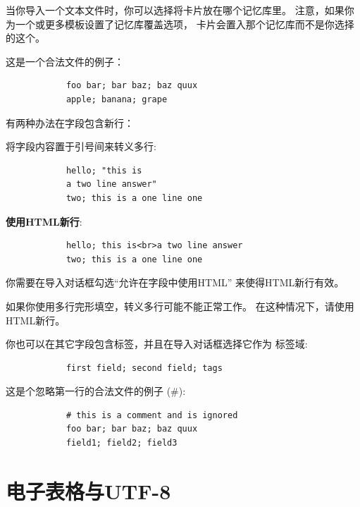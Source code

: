 \documentclass[a4paper]{book}
\begin{document}
		当你导入一个文本文件时，你可以选择将卡片放在哪个记忆库里。 注意，如果你为一个或更多模板设置了记忆库覆盖选项， 卡片会置入那个记忆库而不是你选择的这个。
		
		这是一个合法文件的例子：
		\begin{shaded}\begin{verbatim}
			foo bar; bar baz; baz quux
			apple; banana; grape
			\end{verbatim}\end{shaded}
		有两种办法在字段包含新行：
		
		将字段内容置于引号间来转义多行:
		
		\begin{shaded}\begin{verbatim}
			hello; "this is
			a two line answer"
			two; this is a one line one
			\end{verbatim}\end{shaded}
		
		\textbf{使用HTML新行}:
		
		\begin{shaded}\begin{verbatim}
			hello; this is<br>a two line answer
			two; this is a one line one
			\end{verbatim}\end{shaded}
		
		你需要在导入对话框勾选“允许在字段中使用HTML” 来使得HTML新行有效。
		
		\begin{shaded}
			如果你使用多行完形填空，转义多行可能不能正常工作。 在这种情况下，请使用HTML新行。
		\end{shaded}
		
		你也可以在其它字段包含标签，并且在导入对话框选择它作为 标签域:
		
		\begin{shaded}\begin{verbatim}
			first field; second field; tags
			\end{verbatim}\end{shaded}
		
		这是个忽略第一行的合法文件的例子 (\#):
		
		\begin{shaded}\begin{verbatim}
			# this is a comment and is ignored
			foo bar; bar baz; baz quux
			field1; field2; field3
			\end{verbatim}\end{shaded}
		
		\section{电子表格与UTF-8}
		
\end{document}
